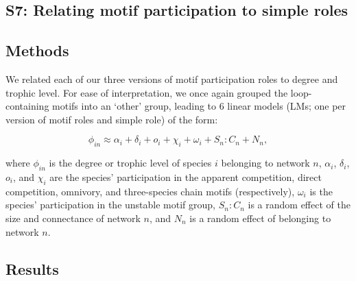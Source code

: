 \documentclass[12pt]{article}
\begin{document}
\begin{spacing}{2.0}
\clearpage


\section*{S7: Relating motif participation to simple roles}

	\subsection*{Methods}

		We related each of our three versions of motif participation roles to degree and trophic level.
        For ease of interpretation, we once again grouped the loop-containing motifs into an `other' group, leading to 6 linear models (LMs; one per version of motif roles and simple role) of the form:

        \begin{equation}
            \phi_{in} \approx \alpha_{i} + \delta_{i} + o_{i} + \chi_{i} + \omega_{i} + S_{n}:C_{n} + N_n,
            \label{eq:degTL_motifs}
        \end{equation}

        \noindent where $\phi_{in}$ is the degree or trophic level of species $i$ belonging to network $n$, $\alpha_{i}$, $\delta_{i}$, $o_{i}$, and $\chi_{i}$ are the species' participation in the apparent competition, direct competition, omnivory, and three-species chain motifs (respectively), $\omega_{i}$ is the species' participation in the unstable motif group, $S_{n}:C_{n}$ is a random effect of the size and connectance of network $n$, and $N_n$ is a random effect of belonging to network $n$.

	\subsection*{Results}


\end{spacing}
\end{document}

